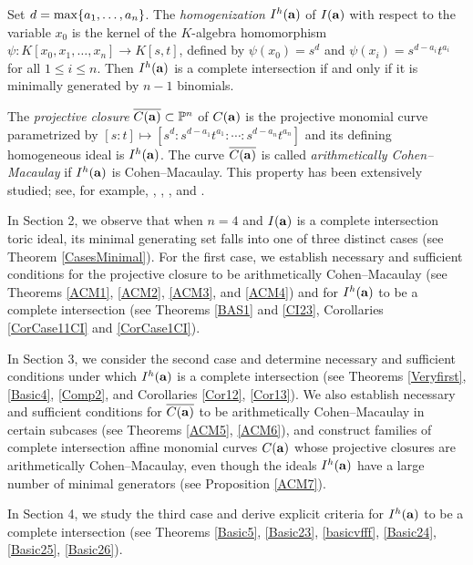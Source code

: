 \documentclass[10pt]{amsart}
\begin{document}
Set $d={\rm max}\{a_1,\ldots,a_n\}$. The {\em homogenization} $I^{h}({\bf a})$ of $I({\bf a})$ with respect to the variable $x_{0}$ is the kernel of the $K$-algebra homomorphism $\psi \colon K[x_{0},x_1,\ldots,x_n] \to K[s,t]$, defined by $\psi(x_{0})=s^{d}$ and $\psi(x_{i})=s^{d-a_{i}}t^{a_i}$ for all $1 \leq i \leq n$. Then $I^{h}({\bf a})$ is a complete intersection if and only if it is minimally generated by $n-1$ binomials. 

The {\em projective closure} $\overline{C({\bf a})} \subset \mathbb{P}^{n}$ of $C({\bf a})$ is the projective monomial curve parametrized by $[s:t] \mapsto [s^{d}:s^{d-a_{1}}t^{a_1}: \cdots: s^{d-a_{n}}t^{a_n}]$ and its defining homogeneous ideal is $I^{h}({\bf a})$. The curve $\overline{C({\bf a})}$ is called {\em arithmetically Cohen--Macaulay} if $I^{h}({\bf a})$ is Cohen--Macaulay. This property has been extensively studied; see, for example, \cite{HerSta}, \cite{Katsa1}, \cite{PatilRoberts2003}, and \cite{SSS}.

In Section 2, we observe that when $n=4$ and $I({\bf a})$ is a complete intersection toric ideal, its minimal generating set falls into one of three distinct cases (see Theorem \ref{CasesMinimal}). For the first case, we establish necessary and sufficient conditions for the projective closure to be arithmetically Cohen–Macaulay (see Theorems \ref{ACM1}, \ref{ACM2}, \ref{ACM3}, and \ref{ACM4}) and for $I^{h}({\bf a})$ to be a complete intersection (see Theorems \ref{BAS1} and \ref{CI23}, Corollaries \ref{CorCase11CI} and \ref{CorCase1CI}).

In Section 3, we consider the second case and determine necessary and sufficient conditions under which $I^{h}({\bf a})$ is a complete intersection (see Theorems \ref{Veryfirst}, \ref{Basic4}, \ref{Comp2}, and Corollaries \ref{Cor12}, \ref{Cor13}). We also establish necessary and sufficient conditions for $\overline{C({\bf a})}$ to be arithmetically Cohen--Macaulay in certain subcases (see Theorems \ref{ACM5}, \ref{ACM6}), and construct families of complete intersection affine monomial curves $C({\bf a})$ whose projective closures are arithmetically Cohen--Macaulay, even though the ideals $I^{h}({\bf a})$ have a large number of minimal generators (see Proposition \ref{ACM7}).

In Section 4, we study the third case and derive explicit criteria for $I^{h}({\bf a})$ to be a complete intersection (see Theorems \ref{Basic5}, \ref{Basic23}, \ref{basicvfff}, \ref{Basic24}, \ref{Basic25}, \ref{Basic26}).
\end{document}
